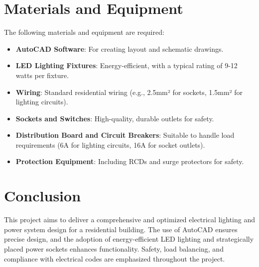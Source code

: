 \documentclass[a4paper,12pt]{article}
\begin{document}
\section{Materials and Equipment}
The following materials and equipment are required:
\begin{itemize}
    \item \textbf{AutoCAD Software}: For creating layout and schematic drawings.
    \item \textbf{LED Lighting Fixtures}: Energy-efficient, with a typical rating of 9-12 watts per fixture.
    \item \textbf{Wiring}: Standard residential wiring (e.g., 2.5mm² for sockets, 1.5mm² for lighting circuits).
    \item \textbf{Sockets and Switches}: High-quality, durable outlets for safety.
    \item \textbf{Distribution Board and Circuit Breakers}: Suitable to handle load requirements (6A for lighting circuits, 16A for socket outlets).
    \item \textbf{Protection Equipment}: Including RCDs and surge protectors for safety.
\end{itemize}

\section{Conclusion}
This project aims to deliver a comprehensive and optimized electrical lighting and power system design for a residential building. The use of AutoCAD ensures precise design, and the adoption of energy-efficient LED lighting and strategically placed power sockets enhances functionality. Safety, load balancing, and compliance with electrical codes are emphasized throughout the project.
\end{document}

